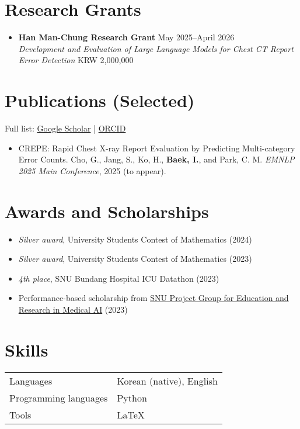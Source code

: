 \documentclass[10pt, a4paper]{article}
\newenvironment{customitemize}
	{\begin{itemize}[leftmargin=*, noitemsep, topsep=0pt, label=$\cdot$]}
	{\end{itemize}}
\begin{document}
\section*{Research Grants}
\begin{customitemize}
    \item \textbf{Han Man-Chung Research Grant} \hfill May 2025--April 2026 \\
    \textit{Development and Evaluation of Large Language Models for Chest CT Report Error Detection} \hfill KRW 2,000,000
\end{customitemize}

\section*{Publications (Selected)}
{Full list: \href{https://scholar.google.com/citations?user=dBshnfkAAAAJ&hl=en}{Google Scholar} \;|\; \href{https://orcid.org/0000-0002-1915-5198}{ORCID}}

\begin{customitemize}
    \item CREPE: Rapid Chest X-ray Report Evaluation by Predicting Multi-category Error Counts.
    Cho, G., Jang, S., Ko, H., \textbf{Baek, I.}, and Park, C. M.
    \textit{EMNLP 2025 Main Conference}, 2025 (to appear).
\end{customitemize}


\section*{Awards and Scholarships}
\begin{customitemize}
    \item \textit{Silver award}, University Students Contest of Mathematics (2024)
    \item \textit{Silver award}, University Students Contest of Mathematics (2023)
    \item \textit{4th place}, SNU Bundang Hospital ICU Datathon (2023)
    \item Performance-based scholarship from \href{http://snuaimed.org/}{SNU Project Group for Education and Research in Medical AI} (2023)
\end{customitemize}

\section*{Skills}
\begin{tabular}{@{}ll@{}}
    Languages & Korean (native), English \\
    Programming languages & Python \\
    Tools & \LaTeX
\end{tabular}
\end{document}
